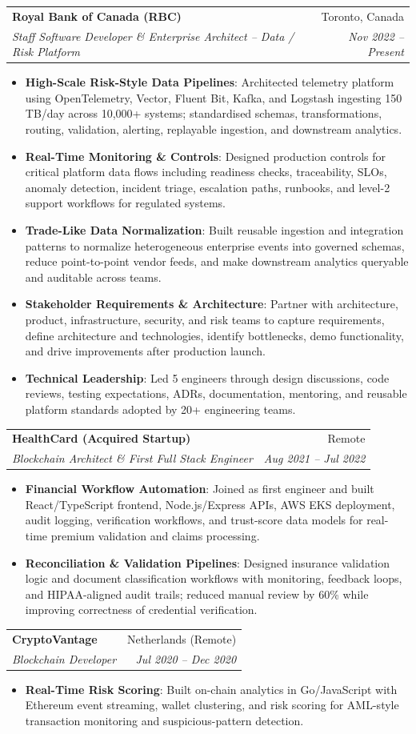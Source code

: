 \documentclass[letterpaper,9.5pt]{article}
\makeatletter
\newcommand{\resumeItem}[2]{\item\small{\textbf{#1}{: #2 \vspace{-2pt}}}}
\newcommand{\resumeSubheading}[4]{\vspace{-2pt}\item\begin{tabular*}{0.97\textwidth}{l@{\extracolsep{\fill}}r}\textbf{#1} & #2 \\\textit{\small#3} & \textit{\small #4} \\\end{tabular*}\vspace{-6pt}}
\newcommand{\resumeItemListStart}{\begin{itemize}}
\newcommand{\resumeItemListEnd}{\end{itemize}\vspace{-6pt}}
\makeatother
\begin{document}
  \resumeSubheading
    {Royal Bank of Canada (RBC)}{Toronto, Canada}
    {Staff Software Developer \& Enterprise Architect -- Data / Risk Platform}{Nov 2022 -- Present}
  \resumeItemListStart
    \resumeItem{High-Scale Risk-Style Data Pipelines}
      {Architected telemetry platform using OpenTelemetry, Vector, Fluent Bit, Kafka, and Logstash ingesting 150\,TB/day across 10,000+ systems; standardised schemas, transformations, routing, validation, alerting, replayable ingestion, and downstream analytics.}
    \resumeItem{Real-Time Monitoring \& Controls}
      {Designed production controls for critical platform data flows including readiness checks, traceability, SLOs, anomaly detection, incident triage, escalation paths, runbooks, and level-2 support workflows for regulated systems.}
    \resumeItem{Trade-Like Data Normalization}
      {Built reusable ingestion and integration patterns to normalize heterogeneous enterprise events into governed schemas, reduce point-to-point vendor feeds, and make downstream analytics queryable and auditable across teams.}
    \resumeItem{Stakeholder Requirements \& Architecture}
      {Partner with architecture, product, infrastructure, security, and risk teams to capture requirements, define architecture and technologies, identify bottlenecks, demo functionality, and drive improvements after production launch.}
    \resumeItem{Technical Leadership}
      {Led 5 engineers through design discussions, code reviews, testing expectations, ADRs, documentation, mentoring, and reusable platform standards adopted by 20+ engineering teams.}
  \resumeItemListEnd

  \resumeSubheading
    {HealthCard (Acquired Startup)}{Remote}
    {Blockchain Architect \& First Full Stack Engineer}{Aug 2021 -- Jul 2022}
  \resumeItemListStart
    \resumeItem{Financial Workflow Automation}
      {Joined as first engineer and built React/TypeScript frontend, Node.js/Express APIs, AWS EKS deployment, audit logging, verification workflows, and trust-score data models for real-time premium validation and claims processing.}
    \resumeItem{Reconciliation \& Validation Pipelines}
      {Designed insurance validation logic and document classification workflows with monitoring, feedback loops, and HIPAA-aligned audit trails; reduced manual review by 60\% while improving correctness of credential verification.}
  \resumeItemListEnd

  \resumeSubheading
    {CryptoVantage}{Netherlands (Remote)}
    {Blockchain Developer}{Jul 2020 -- Dec 2020}
  \resumeItemListStart
    \resumeItem{Real-Time Risk Scoring}
      {Built on-chain analytics in Go/JavaScript with Ethereum event streaming, wallet clustering, and risk scoring for AML-style transaction monitoring and suspicious-pattern detection.}
  \resumeItemListEnd
\end{document}
